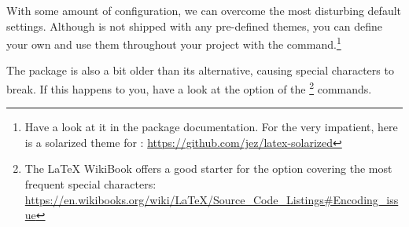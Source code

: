 With some amount of configuration, we can overcome the most disturbing default settings.
Although  is not shipped with any pre-defined themes, you can define your own and use them throughout your project with the  command.\footnote{Have a look at it in the package documentation. For the very impatient, here is a solarized theme for : \url{https://github.com/jez/latex-solarized}}

The package is also a bit older than its alternative, causing  special characters to break. 
If this happens to you, have a look at the  option of the \footnote{The \LaTeX{} WikiBook offers a good starter for the  option covering the most frequent special characters: \url{https://en.wikibooks.org/wiki/LaTeX/Source_Code_Listings\#Encoding_issue}} commands.
